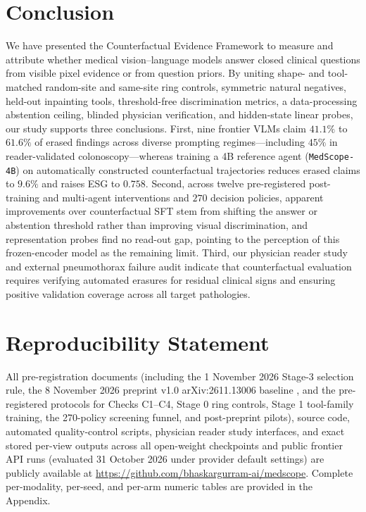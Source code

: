 \documentclass[5p,times,twocolumn,authoryear]{elsarticle}
\begin{document}
\section{Conclusion}
\label{sec:conclusion}
We have presented the Counterfactual Evidence Framework to measure and attribute whether medical vision--language models answer closed clinical questions from visible pixel evidence or from question priors. By uniting shape- and tool-matched random-site and same-site ring controls, symmetric natural negatives, held-out inpainting tools, threshold-free discrimination metrics, a data-processing abstention ceiling, blinded physician verification, and hidden-state linear probes, our study supports three conclusions. First, nine frontier VLMs claim $41.1\%$ to $61.6\%$ of erased findings across diverse prompting regimes---including $45\%$ in reader-validated colonoscopy---whereas training a 4B reference agent (\texttt{MedScope-4B}) on automatically constructed counterfactual trajectories reduces erased claims to $9.6\%$ and raises ESG to $0.758$. Second, across twelve pre-registered post-training and multi-agent interventions and $270$ decision policies, apparent improvements over counterfactual SFT stem from shifting the answer or abstention threshold rather than improving visual discrimination, and representation probes find no read-out gap, pointing to the perception of this frozen-encoder model as the remaining limit. Third, our physician reader study and external pneumothorax failure audit indicate that counterfactual evaluation requires verifying automated erasures for residual clinical signs and ensuring positive validation coverage across all target pathologies.

\section*{Reproducibility Statement}
All pre-registration documents (including the 1 November 2026 Stage-3 selection rule, the 8 November 2026 preprint v1.0 arXiv:2611.13006 baseline \citep{gurram2026medscope}, and the pre-registered protocols for Checks C1--C4, Stage 0 ring controls, Stage 1 tool-family training, the 270-policy screening funnel, and post-preprint pilots), source code, automated quality-control scripts, physician reader study interfaces, and exact stored per-view outputs across all open-weight checkpoints and public frontier API runs (evaluated 31 October 2026 under provider default settings) are publicly available at \url{https://github.com/bhaskargurram-ai/medscope}. Complete per-modality, per-seed, and per-arm numeric tables are provided in the Appendix.
\end{document}
